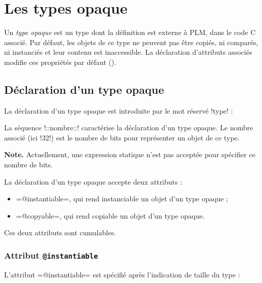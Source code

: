 




\chapter{Les types opaque}

Un \emph{type opaque} est un type dont la définition est externe à PLM, dans le code C associé. Par défaut, les objets de ce type ne peuvent pas être copiés, ni comparés, ni instanciés et leur contenu est inaccessible. La déclaration d'attributs associés modifie ces propriétés par défaut ().

\section{Déclaration d'un type opaque}

La déclaration d'un type opaque est introduite par le mot réservé \plm!type! :


La séquence \plm!::nombre::! caractérise la déclaration d'un type opaque. Le nombre associé (ici \plm!32!) est le nombre de bits pour représenter un objet de ce type.

{\bf Note.} Actuellement, une expression statique n'est pas acceptée pour spécifier ce nombre de bits. 


La déclaration d'un type opaque accepte deux attributs :
\begin{itemize}
\item \plm=@instantiable=, qui rend instanciable un objet d'un type opaque ;
\item \plm=@copyable=, qui rend copiable un objet d'un type opaque.
\end{itemize}

Ces deux attributs sont cumulables.

\subsection{Attribut \texttt{@instantiable}}

L'attribut \plm=@instantiable= est spécifié après l'indication de taille du type :

